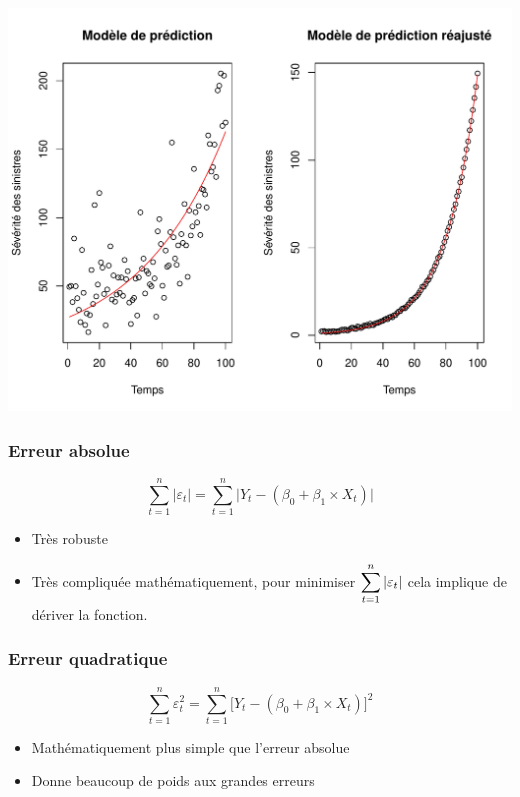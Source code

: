 \documentclass[11pt,french]{report}
\begin{document}
\includegraphics{notes_de_cours-006}

\subsubsection{Erreur absolue}
\begin{equation}
\displaystyle\sum_{t=1}^n |\varepsilon_t| = \displaystyle\sum_{t=1}^n \Big| Y_t - (\beta_0 + \beta_1\times X_t) \Big| 
\end{equation}
\begin{itemize}
\item Très robuste
\item Très compliquée mathématiquement, pour minimiser $\displaystyle\displaystyle\sum_{t=1}^n |\varepsilon_t|$ cela implique de dériver la fonction.
\end{itemize}

\subsubsection{Erreur quadratique}
\begin{equation}
\displaystyle\sum_{t=1}^n \varepsilon_t^2 = \displaystyle\sum_{t=1}^n \Big[ Y_t - (\beta_0 + \beta_1\times X_t) \Big]^2 
\end{equation}
\begin{itemize}
\item Mathématiquement plus simple que l'erreur absolue
\item Donne beaucoup de poids aux grandes erreurs
\end{itemize}
\end{document}
